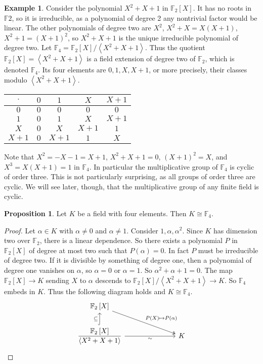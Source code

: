 \documentclass{article}
\newcommand{\F}{\mathbb{F}}
\newcommand{\rb}[1]{\left( #1 \right)}
\renewcommand{\sb}[1]{\left[ #1 \right]}
\newcommand{\ab}[1]{\left\langle #1 \right\rangle}
\theoremstyle{definition}\newtheorem{definition}{Definition}[subsection]
\theoremstyle{definition}\newtheorem{remark}[definition]{Remark}
\theoremstyle{definition}\newtheorem*{example}{Example}
\theoremstyle{definition}\newtheorem*{note}{Note}
\newtheorem{proposition}[definition]{Proposition}
\begin{document}
\begin{example}
Consider the polynomial $ X^2 + X + 1 $ in $ \F_2\sb{X} $. It has no roots in $ \F2 $, so it is irreducible, as a polynomial of degree 2 any nontrivial factor would be linear. The other polynomials of degree two are $ X^2 $, $ X^2 + X = X\rb{X + 1} $, $ X^2 + 1 = \rb{X + 1}^2 $, so $ X^2 + X + 1 $ is the unique irreducible polynomial of degree two. Let $ \F_4 = \F_2\sb{X} / \ab{X^2 + X + 1} $. Thus the quotient $ \F_2\sb{X} = \ab{X^2 + X + 1} $ is a field extension of degree two of $ \F_2 $, which is denoted $ \F_4 $. Its four elements are $ 0, 1, X, X + 1 $, or more precisely, their classes modulo $ \ab{X^2 + X + 1} $.
\begin{center}
\begin{tabular}{|c|c|c|c|c|}
\hline
$ \cdot $ & $ 0 $ & $ 1 $ & $ X $ & $ X + 1 $ \\
\hline
$ 0 $ & $ 0 $ & $ 0 $ & $ 0 $ & $ 0 $ \\
\hline
$ 1 $ & $ 0 $ & $ 1 $ & $ X $ & $ X + 1 $ \\
\hline
$ X $ & $ 0 $ & $ X $ & $ X + 1 $ & $ 1 $ \\
\hline
$ X + 1 $ & $ 0 $ & $ X + 1 $ & $ 1 $ & $ X $ \\
\hline
\end{tabular}
\end{center}
Note that $ X^2 = -X - 1 = X + 1 $, $ X^2 + X + 1 = 0 $, $ \rb{X + 1}^2 = X $, and $ X^3 = X\rb{X + 1} = 1 $ in $ \F_4 $. In particular the multiplicative group of $ \F_4 $ is cyclic of order three. This is not particularly surprising, as all groups of order three are cyclic. We will see later, though, that the multiplicative group of any finite field is cyclic.
\end{example}

\begin{proposition}
Let $ K $ be a field with four elements. Then $ K \cong \F_4 $.
\end{proposition}

\begin{proof}
Let $ \alpha \in K $ with $ \alpha \ne 0 $ and $ \alpha \ne 1 $. Consider $ 1, \alpha, \alpha^2 $. Since $ K $ has dimension two over $ \F_2 $, there is a linear dependence. So there exists a polynomial $ P $ in $ \F_2\sb{X} $ of degree at most two such that $ P\rb{\alpha} = 0 $. In fact $ P $ must be irreducible of degree two. If it is divisible by something of degree one, then a polynomial of degree one vanishes on $ \alpha $, so $ \alpha = 0 $ or $ \alpha = 1 $. So $ \alpha^2 + \alpha + 1 = 0 $. The map $ \F_2\sb{X} \to K $ sending $ X $ to $ \alpha $ descends to $ \F_2\sb{X} / \ab{X^2 + X + 1} \to K $. So $ \F_4 $ embeds in $ K $. Thus the following diagram holds and $ K \cong \F_4 $.
$$
\begin{tikzcd}[column sep=1in]
\F_2\sb{X} \arrow[twoheadrightarrow]{dr}{P\rb{X} \mapsto P\rb{\alpha}} & \\
\dfrac{\F_2\sb{X}}{\ab{X^2 + X + 1}} \arrow[hookrightarrow]{u}{\subseteq} \arrow[swap]{r}{\sim} & K
\end{tikzcd}
$$
\end{proof}
\end{document}
